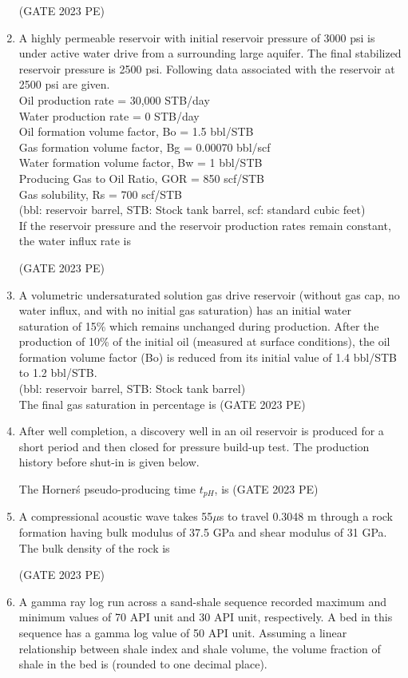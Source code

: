 \documentclass[journal,12pt,onecolumn]{exam}
\theoremstyle{remark}
\begin{document}
\begin{enumerate}
\hfill{(GATE 2023 PE)}
\item A highly permeable reservoir with initial reservoir pressure of 3000 psi is under
active water drive from a surrounding large aquifer. The final stabilized reservoir
pressure is 2500 psi. Following data associated with the reservoir at 2500 psi are
given.\\
Oil production rate = 30,000 STB/day\\
Water production rate = 0 STB/day\\
Oil formation volume factor, Bo = 1.5 bbl/STB\\
Gas formation volume factor, Bg = 0.00070 bbl/scf\\
Water formation volume factor, Bw = 1 bbl/STB\\
Producing Gas to Oil Ratio, GOR = 850 scf/STB\\
Gas solubility, Rs = 700 scf/STB\\
(bbl: reservoir barrel, STB: Stock tank barrel, scf: standard cubic feet)\\
If the reservoir pressure and the reservoir production rates remain constant, the
water influx rate is

\hfill{(GATE 2023 PE)}
\item A volumetric undersaturated solution gas drive reservoir (without gas cap, no
water influx, and with no initial gas saturation) has an initial water saturation of
15\% which remains unchanged during production. After the production of 10\%
of the initial oil (measured at surface conditions), the oil formation volume factor
(Bo) is reduced from its initial value of 1.4 bbl/STB to 1.2 bbl/STB.\\
(bbl: reservoir barrel, STB: Stock tank barrel)\\
The final gas saturation in percentage is
\hfill{(GATE 2023 PE)}
\item After well completion, a discovery well in an oil reservoir is produced for a short
period and then closed for pressure build-up test. The production history before
shut-in is given below.

The Horner\'s pseudo-producing time $t_{pH}$, is
\hfill{(GATE 2023 PE)}
\item A compressional acoustic wave takes 55$\mu$s to travel 0.3048 m through a rock
formation having bulk modulus of 37.5 GPa and shear modulus of 31 GPa. The
bulk density of the rock is

\hfill{(GATE 2023 PE)}
\item A gamma ray log run across a sand-shale sequence recorded maximum and
minimum values of 70 API unit and 30 API unit, respectively. A bed in this
sequence has a gamma log value of 50 API unit.
Assuming a linear relationship between shale index and shale volume, the volume
fraction of shale in the bed is \underline{\hspace{2cm}} (rounded to one decimal place).


\end{enumerate}
\end{document}
